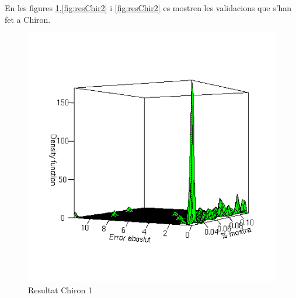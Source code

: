 


	En les figures \ref{fig:resChir1},\ref{fig:resChir2} i \ref{fig:resChir2} es
	mostren les validacions que s'han fet a Chiron.  

	\begin{figure}[tbp]
		\begin{center}
			\includegraphics[scale=0.75]{chiron/rgrau1.png}
		\end{center}
		\caption{Resultat Chiron 1}
		\label{fig:resChir1}
	\end{figure}

